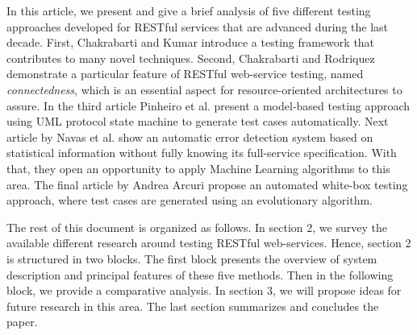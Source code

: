 \documentclass[english]{tktltiki}
\begin{document}
In this article, we present and give a brief analysis of five different testing approaches developed for RESTful services that are advanced during the last decade. First, Chakrabarti and Kumar \cite{chakrabarti2009test} introduce a testing framework that contributes to many novel techniques. Second, Chakrabarti and Rodriquez \cite{chakrabarti2010connectedness} demonstrate a particular feature of RESTful web-service testing, named \textit{connectedness}, which is an essential aspect for resource-oriented architectures to assure. In the third article Pinheiro et al. \cite{pinheiro2013model} present a model-based testing approach using UML protocol state machine to generate test cases automatically. Next article by Navas et al. \cite{navas2014rest} show an automatic error detection system based on statistical information without fully knowing its full-service specification. With that, they open an opportunity to apply Machine Learning algorithms to this area. The final article by Andrea Arcuri \cite{arcuri2017restful} propose an automated white-box testing approach, where test cases are generated using an evolutionary algorithm.

The rest of this document is organized as follows. In section 2, we survey the available different research around testing RESTful web-services. Hence, section 2 is structured in two blocks. The first block presents the overview of system description and principal features of these five methods. Then in the following block, we provide a comparative analysis. In section 3, we will propose ideas for future research in this area. The last section summarizes and concludes the paper.

\end{document}
